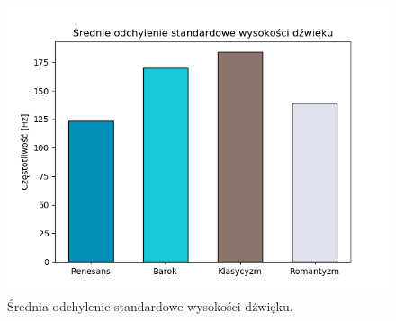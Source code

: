 \documentclass[printmode, eng]{mgr}
\begin{document}
\begin{figure}[H]
\centering
\includegraphics[scale=0.75]{plots/avg_pitch_std.png}
\caption{Średnia odchylenie standardowe wysokości dźwięku.}
\end{figure}
\end{document}

